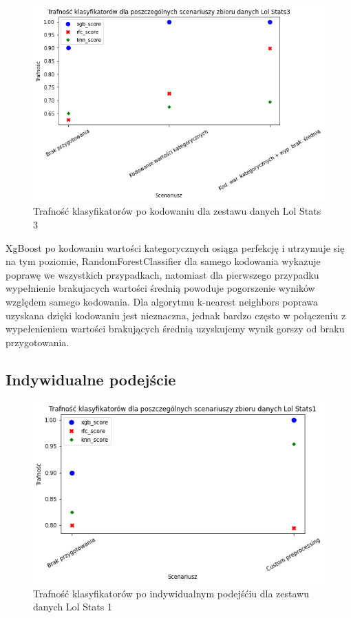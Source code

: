 \documentclass{book}
\begin{document}
\begin{figure}[H]
\centerline{\includegraphics[scale=0.5]{Lol_Stats_3_Kodowanie}}
\centering
\caption{Trafność klasyfikatorów po kodowaniu dla zestawu danych Lol Stats 3}
\end{figure}

XgBoost po kodowaniu wartości kategorycznych osiąga perfekcję i utrzymuje się na tym poziomie, 
RandomForestClassifier dla samego kodowania wykazuje poprawę we wszystkich przypadkach, 
natomiast dla pierwszego przypadku wypełnienie brakujacych wartości średnią powoduje 
pogorszenie wyników względem samego kodowania. Dla algorytmu k-nearest neighbors poprawa uzyskana 
dzięki kodowaniu jest nieznaczna, jednak bardzo często w połączeniu z wypełenieniem wartości brakujących 
średnią uzyskujemy wynik gorszy od braku przygotowania.

\subsection{Indywidualne podejście}

\begin{figure}[H]
\centerline{\includegraphics[scale=0.5]{Lol_Stats_1_Custom}}
\centering
\caption{Trafność klasyfikatorów po indywidualnym podejśćiu dla zestawu danych Lol Stats 1}
\end{figure}
\end{document}
